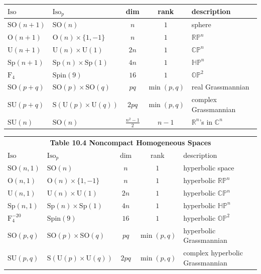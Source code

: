 \begin{definition}
\begin{center}
\begin{tabular}{l|l|c|c|l}
      $\mathrm{Iso}$ & $\mathrm{Iso}_p$ & dim & rank & description\\\hline
      $\mathrm{SO}(n{+}1)$ & $\mathrm{SO}(n)$ & $n$ & $1$ & sphere\\
      $\mathrm O(n{+}1)$ & $\mathrm O(n)\times\{1,-1\}$ & $n$ & $1$ & $\mathbb{RP}^n$\\
      $\mathrm U(n{+}1)$ & $\mathrm U(n)\times\mathrm U(1)$ & $2n$ & $1$ & $\mathbb{CP}^n$\\
      $\mathrm{Sp}(n{+}1)$ & $\mathrm{Sp}(n)\times\mathrm{Sp}(1)$ & $4n$ & $1$ & $\mathbb{HP}^n$\\
      $\mathrm F_4$ & $\mathrm{Spin}(9)$ & $16$ & $1$ & $\mathbb{OP}^2$\\
      $\mathrm{SO}(p{+}q)$ & $\mathrm{SO}(p)\times\mathrm{SO}(q)$ & $pq$ & $\min(p,q)$ & real Grassmannian\\
      $\mathrm{SU}(p{+}q)$ & $\mathrm S(\mathrm U(p)\times\mathrm U(q))$ & $2pq$ & $\min(p,q)$ & complex Grassmannian\\
      $\mathrm{SU}(n)$ & $\mathrm{SO}(n)$ & $\tfrac{n^2-1}2$ & $n-1$ & $\mathbb R^n$'s in $\mathbb C^n$
    \end{tabular}
  \end{center}
  \begin{center}
    \begin{tabular}{l|l|c|c|l}
      \multicolumn{5}{c}{\textbf{Table 10.4 Noncompact Homogeneous Spaces}}\\
      $\mathrm{Iso}$ & $\mathrm{Iso}_p$ & dim & rank & description\\\hline
      $\mathrm{SO}(n,1)$ & $\mathrm{SO}(n)$ & $n$ & $1$ & hyperbolic space\\
      $\mathrm O(n,1)$ & $\mathrm O(n)\times\{1,-1\}$ & $n$ & $1$ & hyperbolic $\mathbb{RP}^n$\\
      $\mathrm U(n,1)$ & $\mathrm U(n)\times\mathrm U(1)$ & $2n$ & $1$ & hyperbolic $\mathbb{CP}^n$\\
      $\mathrm{Sp}(n,1)$ & $\mathrm{Sp}(n)\times\mathrm{Sp}(1)$ & $4n$ & $1$ & hyperbolic $\mathbb{HP}^n$\\
      $\mathrm F_4^{-20}$ & $\mathrm{Spin}(9)$ & $16$ & $1$ & hyperbolic $\mathbb{OP}^2$\\
      $\mathrm{SO}(p,q)$ & $\mathrm{SO}(p)\times\mathrm{SO}(q)$ & $pq$ & $\min(p,q)$ & hyperbolic Grassmannian\\
      $\mathrm{SU}(p,q)$ & $\mathrm S(\mathrm U(p)\times\mathrm U(q))$ & $2pq$ & $\min(p,q)$ & complex hyperbolic Grassmannian\\

\end{tabular}
\end{center}
\end{definition}
